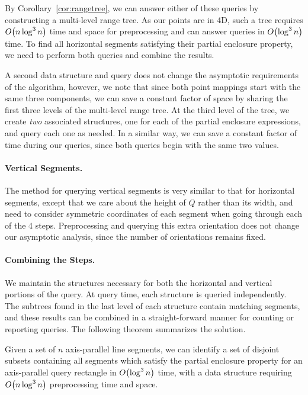 By Corollary~\ref{cor:rangetree}, we can answer either of these queries by constructing a multi-level range tree.
As our points are in 4D, such a tree requires $O\!\left(n \log^3{n}\right)$ time and space for preprocessing and can answer queries in $O\!\left(\log^3{n}\right)$ time.
To find all horizontal segments satisfying their partial enclosure property, we need to perform both queries and combine the results.  

A second data structure and query does not change the asymptotic requirements of the algorithm, however, we note that since both point mappings start with the same three components, we can save a constant factor of space by sharing the first three levels of the multi-level range tree. 
At the third level of the tree, we create \emph{two} associated structures, one for each of the partial enclosure expressions, and query each one as needed. 
In a similar way, we can save a constant factor of time during our queries, since both queries begin with the same two values.


\paragraph{Vertical Segments.} The method for querying vertical segments is very similar to that for horizontal segments, except that we care about the height of $Q$ rather than its width, and need to consider symmetric coordinates of each segment when going through each of the 4 steps.
Preprocessing and querying this extra orientation does not change our asymptotic analysis, since the number of orientations remains fixed.


\paragraph{Combining the Steps.} We maintain the structures necessary for both the horizontal and vertical portions of the query.
At query time, each structure is queried independently. 
The subtrees found in the last level of each structure contain matching segments, and these results can be combined in a straight-forward manner for counting or reporting queries.
The following theorem summarizes the solution.

\begin{theorem}
\label{th:ap}
Given a set of $n$ axis-parallel line segments, we can identify a set of disjoint subsets containing all segments which satisfy the partial enclosure property for an axis-parallel query rectangle in $O\!\left(\log^3{n}\right)$ time, with a data structure requiring $O\!\left(n\log^3{n}\right)$ preprocessing time and space.
\end{theorem}

